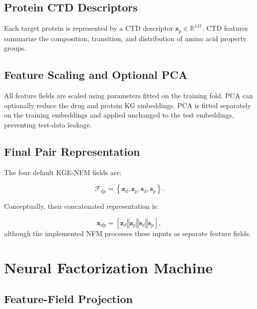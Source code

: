 \subsection{Protein CTD Descriptors}

Each target protein is represented by a CTD descriptor
$\mathbf{s}_{p}\in\mathbb{R}^{147}$. CTD features summarize the composition,
transition, and distribution of amino acid property groups.

\subsection{Feature Scaling and Optional PCA}

All feature fields are scaled using parameters fitted on the training fold.
PCA can optionally reduce the drug and protein KG embeddings. PCA is fitted
separately on the training embeddings and applied unchanged to the test
embeddings, preventing test-data leakage.

\subsection{Final Pair Representation}

The four default KGE-NFM fields are:

\begin{equation}
    \mathcal{F}_{dp}
    =
    \left\{
        \mathbf{z}_{d},
        \mathbf{z}_{p},
        \mathbf{s}_{d},
        \mathbf{s}_{p}
    \right\}.
    \label{eq:kge_nfm_fields}
\end{equation}

Conceptually, their concatenated representation is:

\begin{equation}
    \mathbf{x}_{dp}
    =
    [
        \mathbf{z}_{d}
        \mathbin{\Vert}
        \mathbf{z}_{p}
        \mathbin{\Vert}
        \mathbf{s}_{d}
        \mathbin{\Vert}
        \mathbf{s}_{p}
    ],
\end{equation}
although the implemented NFM processes these inputs as separate feature fields.

\section{Neural Factorization Machine}

\subsection{Feature-Field Projection}

